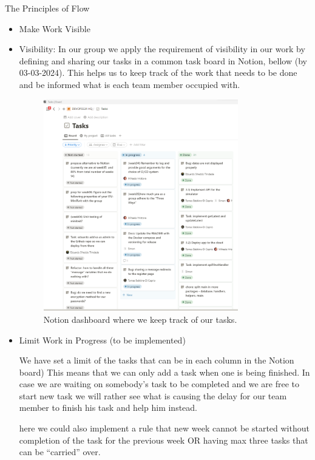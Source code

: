 \documentclass{article}
\begin{document}
The Principles of Flow

\begin{itemize}

\item Make Work Visible
  \item Visibility:  In our group we apply the requirement of visibility in our work by defining and sharing our tasks in a common task board in Notion, bellow (by 03-03-2024). This helps us to keep track of the work that needs to be done and be informed what is each team member occupied with.

\begin{figure}[ht]
    \centering
    \includegraphics[width=0.8\textwidth]{./images/notion-dashboard-visibility-three-ways.png}
    \caption{Notion dashboard where we keep track of our tasks.}
    \label{fig:notion-dashboard}
\end{figure}
    
\item Limit Work in Progress
(to be implemented)

We have set a limit of the tasks  that can  be in each column in the Notion board) This means that we can only add a task when one is being finished. In case we are waiting on somebody’s task to be completed and we are free to start new task we will rather see what is causing the delay for our team member to finish his task and help him instead. 

here we could also implement a rule that new week cannot be started without completion of the task for the previous week OR having max three tasks that can be “carried” over.


\end{itemize}
\end{document}
